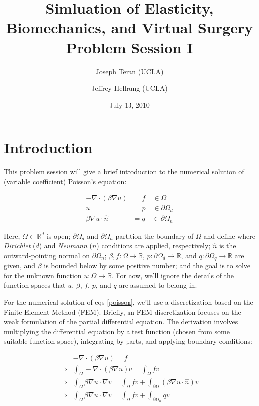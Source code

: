 \documentclass{article}
\title{Simluation of Elasticity, Biomechanics, and Virtual Surgery \\
       Problem Session I}
\date{July 13, 2010}
\author{Joseph Teran (UCLA) \and
        Jeffrey Hellrung (UCLA)}
\begin{document}
\maketitle

\section{Introduction}

This problem session will give a brief introduction to the numerical solution of (variable coefficient) Poisson's equation:

\begin{subequations}\label{poisson}
\begin{align}
-\nabla \cdot \left( \beta \nabla u \right) & = f \quad \in \Omega \\
u & = p \quad \in \partial \Omega_d \\
\beta \nabla u \cdot \hat{n} & = q \quad \in \partial \Omega_n
\end{align}
\end{subequations}

Here, \(\Omega \subset \mathbb{R}^d\) is open; \(\partial \Omega_d\) and \(\partial \Omega_n\) partition the boundary of \(\Omega\) and define where {\em Dirichlet} (\(d\)) and {\em Neumann} (\(n\)) conditions are applied, respectively; \(\hat{n}\) is the outward-pointing normal on \(\partial \Omega_n\); \(\beta, f : \Omega \to \mathbb{R}\), \(p : \partial \Omega_d \to \mathbb{R}\), and \(q : \partial \Omega_q \to \mathbb{R}\) are given, and \(\beta\) is bounded below by some positive number; and the goal is to solve for the unknown function \(u : \Omega \to \mathbb{R}\).  For now, we'll ignore the details of the function spaces that \(u\), \(\beta\), \(f\), \(p\), and \(q\) are assumed to belong in.

For the numerical solution of eqs \eqref{poisson}, we'll use a discretization based on the Finite Element Method (FEM).  Briefly, an FEM discretization focuses on the weak formulation of the partial differential equation.  The derivation involves multiplying the differential equation by a test function (chosen from some suitable function space), integrating by parts, and applying boundary conditions:

\begin{subequations}
\begin{align}
& -\nabla \cdot \left( \beta \nabla u \right) = f \\
\Rightarrow & \int_{\Omega} -\nabla \cdot \left( \beta \nabla u \right) v = \int_{\Omega} f v \\
\Rightarrow & \int_{\Omega} \beta \nabla u \cdot \nabla v =
    \int_{\Omega} f v + \int_{\partial \Omega} \left( \beta \nabla u \cdot \hat{n} \right) v \label{weakc} \\
\Rightarrow & \int_{\Omega} \beta \nabla u \cdot \nabla v = \int_{\Omega} f v + \int_{\partial \Omega_n} q v \label{weakd}
\end{align}
\end{subequations}
\end{document}
